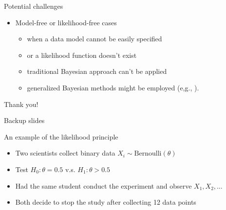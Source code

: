 \documentclass[11pt
,fragile=singleslide
,xcolor=dvipsnames
]{beamer}
\begin{document}
\begin{frame}{Potential challenges}
	\begin{itemize}
		\item Model-free or likelihood-free cases
		\begin{itemize}
			\item when a data model cannot be easily specified 
			\item or a likelihood function doesn't exist
			\item traditional Bayesian approach can't be applied
			\pause
			\item \textcolor{Cerulean}{generalized Bayesian} methods might be employed (e,g., \cite{turner2014generalized, lyddon2019general, bissiri2016general}).
		\end{itemize}
	\end{itemize}
	
\end{frame}


\begin{frame}
	\Huge{\centerline{Thank you!}}
\end{frame}


\begin{frame}
	\Huge{\centerline{Backup slides}}
\end{frame}


\begin{frame}{An example of the likelihood principle}
	\begin{itemize}
		\item Two scientists collect binary data $X_i \sim \text{Bernoulli}(\theta)$
		\item Test $H_0: \theta = 0.5$ v.s. $H_1: \theta > 0.5$
		\item Had the same student conduct the experiment and observe $X_1, X_2, \ldots$
		\item Both decide to stop the study after collecting 12 data points
	\end{itemize}
	

\end{frame}
\end{document}
